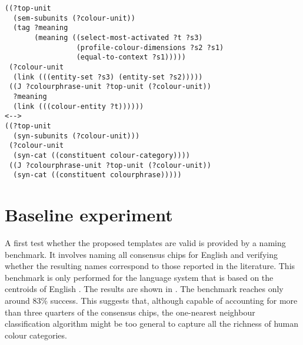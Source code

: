\footnotesize
{}
\begin{lstlisting}
((?top-unit
  (sem-subunits (?colour-unit))
  (tag ?meaning
       (meaning ((select-most-activated ?t ?s3)
                 (profile-colour-dimensions ?s2 ?s1)
                 (equal-to-context ?s1)))))
 (?colour-unit
  (link (((entity-set ?s3) (entity-set ?s2)))))
 ((J ?colourphrase-unit ?top-unit (?colour-unit))
  ?meaning
  (link (((colour-entity ?t))))))
<-->
((?top-unit 
  (syn-subunits (?colour-unit)))
 (?colour-unit 
  (syn-cat ((constituent colour-category))))
 ((J ?colourphrase-unit ?top-unit (?colour-unit))
  (syn-cat ((constituent colourphrase)))))
\end{lstlisting}
\normalsize

\section{Baseline experiment}
\label{s:basic-baseline-experiment}

A first test whether the proposed templates are valid is provided by a
naming benchmark. It
involves naming all consensus chips for English
\citep{sturges95location} and verifying whether the resulting names
correspond to those reported in the literature. This benchmark is only
performed for the language system that is based on the centroids of
English \citep{sturges95location}. The results are shown in . The benchmark reaches only around 83\%
success.  This suggests that, although capable of accounting for more
than three quarters of the consensus chips, the one-nearest neighbour
classification algorithm might be too general to capture all the
richness of human colour categories.

